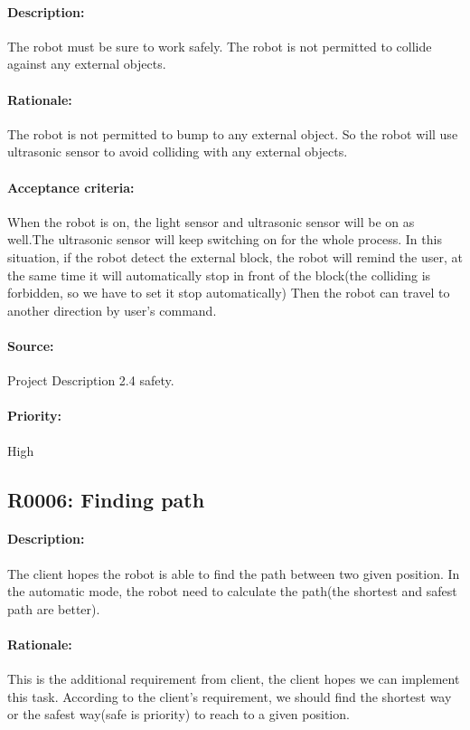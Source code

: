 \documentclass[11pt, a4paper]{report}
\begin{document}
\paragraph{Description:}
The robot must be sure to work safely. The robot is not permitted to collide against any external objects.
\paragraph{Rationale:}
The robot is not permitted to bump to any external object. So the robot will use ultrasonic sensor to avoid colliding with any external objects.
\paragraph{Acceptance criteria:}
When the robot is on, the light sensor and ultrasonic sensor will be on as well.The ultrasonic sensor will keep switching on for the whole process. In this situation, if the robot detect the external block, the robot will remind the user, at the same time it will automatically stop in front of the block(the colliding is forbidden, so we have to set it stop automatically) Then the robot can travel to another direction by user's command.
\paragraph{Source:}
Project Description 2.4 safety.  
\paragraph{Priority:}
High


\subsection{R0006: Finding path }
\paragraph{Description:}
The client hopes the robot is able to find the path between two given position. In the automatic mode, the robot need to calculate the path(the shortest and safest path are better).    
\paragraph{Rationale:}
This is the additional requirement from client, the client hopes we can implement this task. According to the client's requirement, we should find the shortest way or the safest way(safe is priority) to reach to a given position. 
\end{document}
